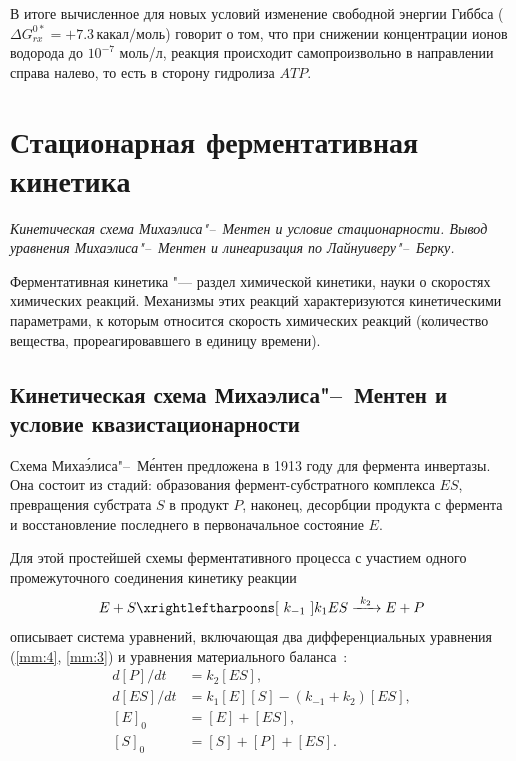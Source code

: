 \documentclass[12pt,a4paper,oneside]{book}
\begin{document}
В итоге вычисленное для новых условий  изменение свободной энергии Гиббса ($\Delta G_{rx}^{0*} =  + 7.3 \, \textit{какал/моль}$) говорит о том, что при снижении концентрации ионов водорода до $10^{-7}  $ моль/л, реакция происходит самопроизвольно в направлении справа налево, то есть в сторону гидролиза $ATP$.




\newpage
\section{Стационарная ферментативная кинетика}
{\it Кинетическая схема Михаэлиса"--~Ментен и условие стационарности. Вывод уравнения Михаэлиса"--~Ментен и линеаризация по Лайнуиверу"--~Берку.}

Ферментативная кинетика "--- раздел химической кинетики, науки о скоростях химических реакций. Механизмы этих реакций характеризуются кинетическими параметрами, к которым относится скорость химических реакций (количество вещества, прореагировавшего в единицу времени).

\subsection{Кинетическая схема Михаэлиса"--~Ментен и условие квазистационарности}

Схема Миха\'{э}лиса"--~М\'{е}нтен предложена в 1913 году для фермента инвертазы. Она состоит из стадий: образования фермент-субстратного комплекса $ES$, превращения субстрата $S$ в продукт $P$, наконец, десорбции продукта с фермента и восстановление последнего в первоначальное состояние $E$.

Для этой простейшей схемы ферментативного процесса с участием одного промежуточного соединения кинетику реакции
\begin{equation}
	E + S \xrightleftharpoons[~k_{-1}~]{k_1} ES \xrightarrow{~k_2~} E + P
	\label{MichaelisScheme}
\end{equation}
описывает система уравнений, включающая два дифференциальных уравнения (\ref{mm:4}, \ref{mm:3}) и уравнения материального баланса~\cite{Varfolomeev2005, Berezin1979}:
\begin{align}
d{[P]} /dt & = k_2 [ES], \label{mm:4}\\
d{[ES]}/dt & = k_1 [E][S] - (k_{-1} + k_2) [ES], \label{mm:3}\\
[E]_0      & = [E] + [ES], \label{mm:2}\\
[S]_0      & = [S] + [P] + [ES]. \label{mm:1}
\end{align}
\end{document}
